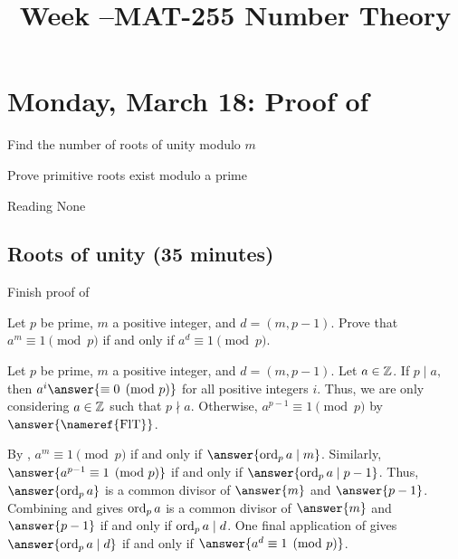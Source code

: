 \documentclass[letterpaper, 11 pt]{ximera}
\title{Week \week--MAT-255 Number Theory}
\begin{document}
\section{Monday, March 18: Proof of }

\begin{obj}
    \item Find the number of roots of unity modulo $m$
    \item Prove primitive roots exist modulo a prime
\end{obj}


\begin{pre}
    \item[Reading] None
\end{pre}

\subsection{Roots of unity (35 minutes)}

Finish proof of 


\begin{br}\label{br:condition-root-unity}
    Let $p$ be prime, $m$ a positive integer, and $d=(m,p-1).$ Prove that $a^m\equiv 1\pmod{p}$ if and only if $a^d\equiv 1\pmod{p}.$


    \begin{solution}
        Let $p$ be prime, $m$ a positive integer, and $d=(m,p-1).$ Let $a\in\mathbb Z$. If $p\mid a,$ then $a^i\answer{\equiv 0\pmod{p}}$ for all positive integers $i$. 
        Thus, we are only considering $a\in\mathbb Z$ such that $p\nmid a.$
        Otherwise, $a^{p-1}\equiv 1\pmod{p}$ by $\answer{\textnormal{\nameref{FlT}}}$.
        
        By , $a^m\equiv 1\pmod{p}$ if and only if $\answer{\ord_p a \mid m}$. Similarly, $\answer{a^{p-1}\equiv 1\pmod{p}}$ if and only if $\answer{\ord_p a \mid p-1}$. Thus, $\answer{\ord_p a}$ is a common divisor of $\answer{m}$ and $\answer{p-1}$. Combining  and  gives $\operatorname{ord}_p a$ is a common divisor of   $\answer{m}$ and $\answer{p-1}$ if and only if $\operatorname{ord}_p a\mid d$. One final application of  gives $\answer{\ord_p a\mid d}$ if and only if $\answer{a^d\equiv 1\pmod{p}}$.
    \end{solution}
\end{br}
\end{document}
